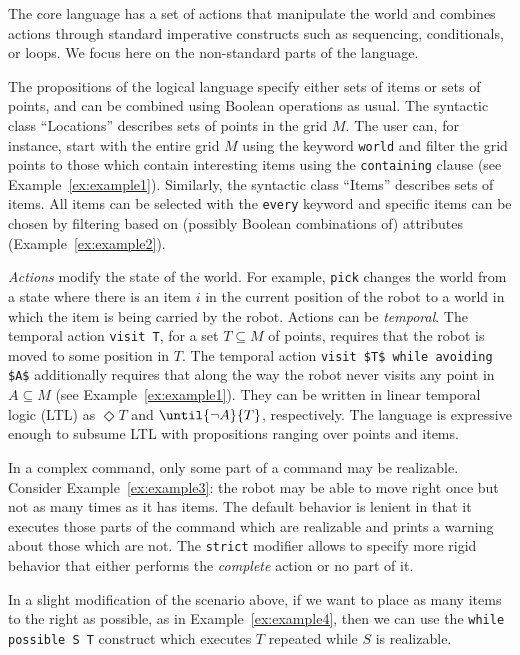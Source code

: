 The core language has a set of actions that manipulate the world and combines
actions through standard imperative constructs such as sequencing, conditionals, or loops.
We focus here on the non-standard parts of the language.

The propositions of the logical language specify either sets of items or sets of
points, and can be combined using Boolean operations as usual.
The syntactic class ``Locations'' describes sets of points in the grid $M$.
The user can, for instance, start with the entire grid $M$ using
the keyword \lstinline{world} and filter the grid points to those which
contain interesting items using the \lstinline{containing} clause
(see Example~\ref{ex:example1}).
Similarly, the syntactic class ``Items'' describes sets of items.
All items can be selected with the \lstinline{every} keyword and specific items can be chosen
by filtering based on (possibly Boolean combinations of) attributes
(Example~\ref{ex:example2}).

\emph{Actions} modify the state of the world. For example, \lstinline{pick} changes the
world from a state where there is an item $i$ in the current position of the
robot to a world in which the item is being carried by the robot.
Actions can be \emph{temporal}.
The temporal action \lstinline{visit T}, for a set $T\subseteq M$ of points,
requires that the robot is moved to some position in $T$.
The temporal action \lstinline{visit $T$ while avoiding $A$} additionally requires
that along the way the robot never visits any point in $A\subseteq M$
(see Example~\ref{ex:example1}).
They can be written in linear temporal logic (LTL) as $\Diamond T$ and $\until{\lnot A}{T}$,
respectively.
The language is expressive enough to subsume LTL with propositions ranging over points and
items.


In a complex command, only some part of a command may be realizable.
Consider Example~\ref{ex:example3}: the robot
may be able to move right once but not as many times as it has items.
The default behavior is lenient in that it executes those parts of the command
which are realizable and prints a warning about those which are not.
The \lstinline{strict} modifier allows to specify more rigid behavior that
either performs the \emph{complete} action or no part of it.

In a slight modification of the scenario above, if we want to place as many
items to the right as possible, as in Example~\ref{ex:example4}, then we can use
the \lstinline{while possible S T} construct which executes $T$ repeated while
$S$ is realizable.


